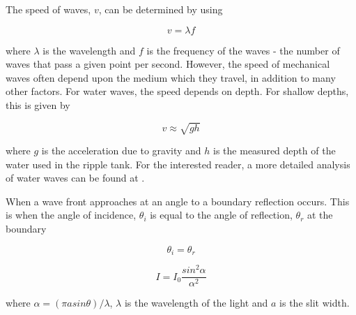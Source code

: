 \documentclass{article}
\begin{document}
The speed of waves, $v$, can be determined by using 

\begin{equation}
\label{eq:wave-speed}
v = \lambda f
\end{equation}

\vspace{2mm}
\noindent
where $\lambda$ is the wavelength and $f$ is the frequency of the waves - the number of waves that pass a given point per second. However, the speed of mechanical waves often depend upon the medium which they travel, in addition to many other factors. For water waves, the speed depends on depth. For shallow depths, this is given by \cite{Book02}

\begin{equation}
\label{eq:water-waves}
v \approx \sqrt{gh}
\end{equation}

\vspace{2mm}
\noindent
where $g$ is the acceleration due to gravity and $h$ is the measured depth of the water used in the ripple tank. For the interested reader, a more detailed analysis of water waves can be found at \cite{Book02}. 

\vspace{2mm}
\noindent
When a wave front approaches at an angle to a boundary reflection occurs. This is when the angle of incidence, $\theta_i$ is equal to the angle of reflection, $\theta_r$ at the boundary

\begin{equation}
\label{eq:reflection}
\theta_i = \theta_r
\end{equation}

\vspace{2mm}
\noindent


\vspace{2mm}
\noindent




\vspace{2mm}
\noindent


\begin{equation}
\label{eq:intensity1}
I = I_0 \frac{sin^2{\alpha}}{\alpha^2}
\end{equation}

\vspace{2mm}
\noindent
where $\alpha = ({\pi asin{\theta}}) / {\lambda}$, $\lambda$ is the wavelength of the light and $a$ is the slit width.
\end{document}
